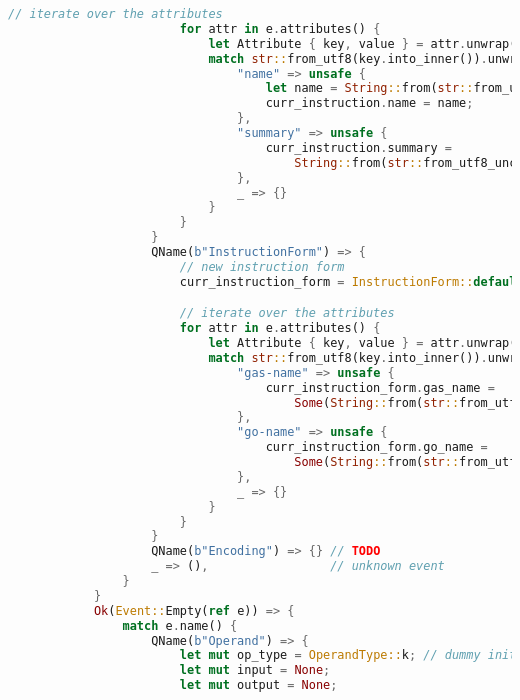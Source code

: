 \begin{lstlisting}[language=rust]
                        // iterate over the attributes
                        for attr in e.attributes() {
                            let Attribute { key, value } = attr.unwrap();
                            match str::from_utf8(key.into_inner()).unwrap() {
                                "name" => unsafe {
                                    let name = String::from(str::from_utf8_unchecked(&value).to_lowercase());
                                    curr_instruction.name = name;
                                },
                                "summary" => unsafe {
                                    curr_instruction.summary =
                                        String::from(str::from_utf8_unchecked(&value));
                                },
                                _ => {}
                            }
                        }
                    }
                    QName(b"InstructionForm") => {
                        // new instruction form 
                        curr_instruction_form = InstructionForm::default();

                        // iterate over the attributes
                        for attr in e.attributes() {
                            let Attribute { key, value } = attr.unwrap();
                            match str::from_utf8(key.into_inner()).unwrap() {
                                "gas-name" => unsafe {
                                    curr_instruction_form.gas_name =
                                        Some(String::from(str::from_utf8_unchecked(&value).to_lowercase()));
                                },
                                "go-name" => unsafe {
                                    curr_instruction_form.go_name =
                                        Some(String::from(str::from_utf8_unchecked(&value).to_lowercase()));
                                },
                                _ => {}
                            }
                        }
                    }
                    QName(b"Encoding") => {} // TODO
                    _ => (),                 // unknown event
                }
            }
            Ok(Event::Empty(ref e)) => {
                match e.name() {
                    QName(b"Operand") => {
                        let mut op_type = OperandType::k; // dummy initialisation
                        let mut input = None;
                        let mut output = None;


\end{lstlisting}
